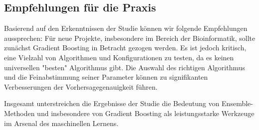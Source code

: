\subsection{Empfehlungen für die Praxis}
Basierend auf den Erkenntnissen der Studie können wir folgende Empfehlungen aussprechen: Für neue Projekte, insbesondere im Bereich der Bioinformatik, sollte zunächst Gradient Boosting in Betracht gezogen werden. Es ist jedoch kritisch, eine Vielzahl von Algorithmen und Konfigurationen zu testen, da es keinen universellen "besten" Algorithmus gibt. Die Auswahl des richtigen Algorithmus und die Feinabstimmung seiner Parameter können zu signifikanten Verbesserungen der Vorhersagegenauigkeit führen.

Insgesamt unterstreichen die Ergebnisse der Studie die Bedeutung von Ensemble-Methoden und insbesondere von Gradient Boosting als leistungsstarke Werkzeuge im Arsenal des maschinellen Lernens.

